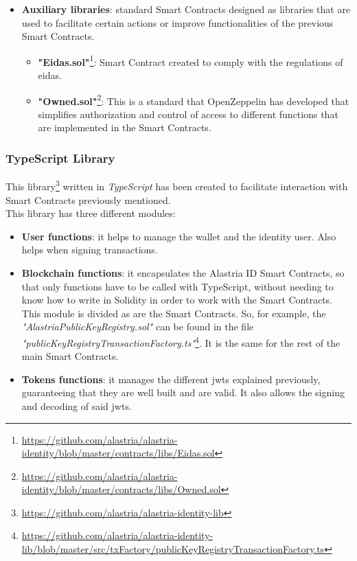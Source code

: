 \documentclass[a4paper, 12pt]{article} %
\begin{document}
\begin{itemize}
\begin{itemize}
                \end{itemize}
                \item \textbf{Auxiliary libraries}: standard Smart Contracts designed as libraries that are used to facilitate certain actions or improve functionalities of the previous Smart Contracts.
                \begin{itemize}
                    \item \textbf{"Eidas.sol"}\footnote{\url{https://github.com/alastria/alastria-identity/blob/master/contracts/libs/Eidas.sol}}: Smart Contract created to comply with the regulations of \acrfull{eidas}.
                    \item \textbf{"Owned.sol"}\footnote{\url{https://github.com/alastria/alastria-identity/blob/master/contracts/libs/Owned.sol}}: This is a standard that OpenZeppelin\cite{openzeppelin} has developed that simplifies authorization and control of access to different functions that are implemented in the Smart Contracts.
                \end{itemize}
            \end{itemize}
        
        \subsubsection{TypeScript Library}
            This library\footnote{\url{https://github.com/alastria/alastria-identity-lib}} written in \textit{TypeScript} has been created to facilitate interaction with Smart Contracts previously mentioned.\\
            
            This library has three different modules:
            \begin{itemize}
                \item \textbf{User functions}: it helps to manage the wallet and the identity user. Also helps when signing transactions.
                \item \textbf{Blockchain functions}: it encapsulates the Alastria ID Smart Contracts, so that only functions have to be called with TypeScript, without needing to know how to write in Solidity in order to work with the Smart Contracts. This module is divided as are the Smart Contracts. So, for example, the \textit{"AlastriaPublicKeyRegistry.sol"} can be found in the file \textit{"publicKeyRegistryTransactionFactory.ts"}\footnote{\url{https://github.com/alastria/alastria-identity-lib/blob/master/src/txFactory/publicKeyRegistryTransactionFactory.ts}}. It is the same for the rest of the main Smart Contracts.
                \item \textbf{Tokens functions}: it manages the different \acrshort{jwt}s explained previously, guaranteeing that they are well built and are valid. It also allows the signing and decoding of said \acrshort{jwt}s.
            \end{itemize}
            
\end{document}
